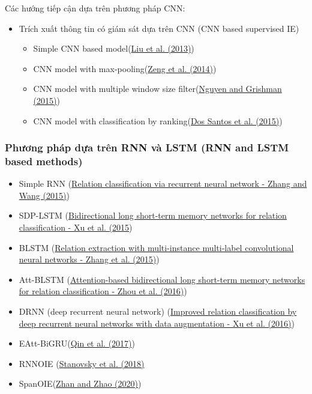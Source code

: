 Các hướng tiếp cận dựa trên phương pháp CNN:
\begin{itemize}
    \item Trích xuất thông tin có giám sát dựa trên CNN (CNN based supervised IE)
    \begin{itemize}
        \item Simple CNN based model(\href{https://scholar.google.com/scholar_lookup?title=Convolution%20neural%20network%20for%20relation%20extraction&publication_year=2013&author=C.%20Liu&author=W.%20Sun&author=W.%20Chao&author=W.%20Che}{Liu et al. (2013)})
        \item CNN model with max-pooling(\href{https://www.scopus.com/inward/record.url?eid=2-s2.0-84959862537&partnerID=10&rel=R3.0.0}{Zeng et al. (2014)})
        \item CNN model with multiple window size filter(\href{https://www.sciencedirect.com/science/article/pii/S2667305323000698#br1010}{Nguyen and Grishman (2015)})
        \item CNN model with classification by ranking(\href{https://www.sciencedirect.com/science/article/pii/S2667305323000698#br0330}{Dos Santos et al. (2015)})
    \end{itemize}
\end{itemize}

\newpage
\subsubsection{Phương pháp dựa trên RNN và LSTM (RNN and LSTM based methods)}
\begin{itemize}
    \item Simple RNN (\href{https://arxiv.org/abs/1508.01006}{Relation classification via recurrent neural network - Zhang and Wang (2015)})
    \item SDP-LSTM (\href{https://aclanthology.org/D15-1206}{Bidirectional long short-term memory networks for relation classification - Xu et al. (2015})
    \item BLSTM (\href{https://aclanthology.org/C16-1139}{Relation extraction with multi-instance multi-label convolutional neural networks - Zhang et al. (2015)})
    \item Att-BLSTM (\href{https://aclanthology.org/P16-2034}{Attention-based bidirectional long short-term memory networks for relation classification - Zhou et al. (2016)})
    \item DRNN (deep recurrent neural network) (\href{https://aclanthology.org/C16-1138}{Improved relation classification by deep recurrent neural networks with data augmentation - Xu et al. (2016)})
    \item EAtt-BiGRU(\href{https://doi.org/10.1109/IJCNN.2017.7966407}{Qin et al. (2017)})
    \item RNNOIE (\href{https://aclanthology.org/N18-1081}{Stanovsky et al. (2018)}
    \item SpanOIE(\href{https://www.scopus.com/inward/record.url?eid=2-s2.0-85106555459&partnerID=10&rel=R3.0.0}{Zhan and Zhao (2020)})
\end{itemize}


